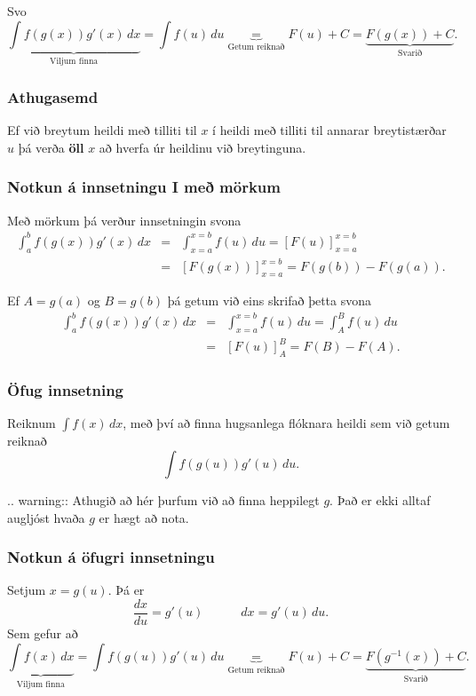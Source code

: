 \documentclass[icelandic,a4paper,12pt]{article}
\begin{document}
Svo
$$
\underbrace{\int f(g(x))g'(x)\,dx}_{\text{Viljum finna}}  = 
\int f(u)\,du  
\underbrace{=}_{\text{Getum reiknað}} F(u)+C  =
\underbrace{F(g(x))+C}_{\text{Svarið}}.
$$

\subsubsection{Athugasemd}
Ef við breytum heildi með tilliti til $x$ í heildi með tilliti til 
annarar breytistærðar $u$ þá verða {\bf öll} $x$ að hverfa úr heildinu
við breytinguna.

\subsubsection{Notkun á innsetningu I með mörkum}
Með mörkum þá verður innsetningin svona
\begin{eqnarray*}
  \int_a^b f(g(x))g'(x)\, dx  &=&
  \int_{x=a}^{x=b} f(u)\, du  = 
  [F(u)]_{x=a}^{x=b}    \\ &=& 
  [F(g(x))]_{x=a}^{x=b}     =
  F(g(b)) - F(g(a)).
\end{eqnarray*}
	
Ef $A=g(a)$ og $B=g(b)$  þá getum við eins skrifað þetta svona
\begin{eqnarray*}
\int_a^b f(g(x))g'(x)\, dx  &=&
\int_{x=a}^{x=b} f(u)\, du  = 
\int_{A}^{B} f(u)\, du    \\ &=& 
[F(u)]_A^B      = 
F(B) - F(A).
\end{eqnarray*}

\subsubsection{Öfug innsetning}
Reiknum $\int f(x)\, dx$, með því að finna 
hugsanlega flóknara heildi sem við getum reiknað
$$
\int f(g(u))g'(u)\, du.
$$

.. warning::
  Athugið að hér þurfum við að finna heppilegt $g$. Það er ekki alltaf
  augljóst hvaða $g$ er hægt að nota.

\subsubsection{Notkun á öfugri innsetningu}
Setjum $x=g(u)$. Þá er
$$
  \frac{dx}{du}=g'(u)\qquad\quad dx=g'(u)\,du.
$$
Sem gefur að 
$$
\underbrace{\int f(x)\,dx}_{\text{Viljum finna}}  =
\int f(g(u))g'(u)\,du \underbrace{=}_{\text{Getum reiknað}} F(u) + C
= \underbrace{F(g^{-1}(x)) + C}_{\text{Svarið}}.
$$
\end{document}
